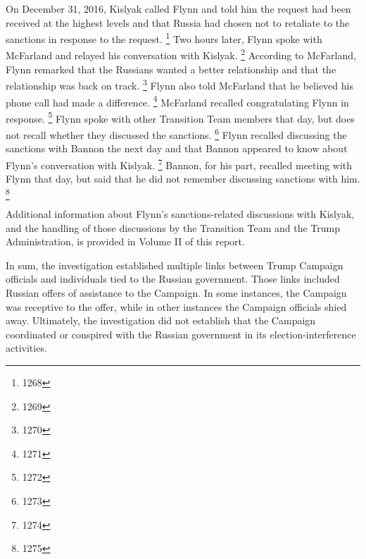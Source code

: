 On December 31, 2016, Kislyak called Flynn and told him the request had been received at the highest levels and that Russia had chosen not to retaliate to the sanctions in response to the request.%
\footnote{1268}
Two hours later, Flynn spoke with McFarland and relayed his conversation with Kislyak.%
\footnote{1269}
According to McFarland, Flynn remarked that the Russians wanted a better relationship and that the relationship was back on track.%
\footnote{1270}
Flynn also told McFarland that he believed his phone call had made a difference.%
\footnote{1271}
McFarland recalled congratulating Flynn in response.%
\footnote{1272}
Flynn spoke with other Transition Team members that day, but does not recall whether they discussed the sanctions.%
\footnote{1273}
Flynn recalled discussing the sanctions with Bannon the next day and that Bannon appeared to know about Flynn's conversation with Kislyak.%
\footnote{1274}
Bannon, for his part, recalled meeting with Flynn that day, but said that he did not remember discussing sanctions with him.%
\footnote{1275}

Additional information about Flynn's sanctions-related discussions with Kislyak, and the handling of those discussions by the Transition Team and the Trump Administration, is provided in Volume II of this report.

\hr

In sum, the investigation established multiple links between Trump Campaign officials and individuals tied to the Russian government.
Those links included Russian offers of assistance to the Campaign.
In some instances, the Campaign was receptive to the offer, while in other instances the Campaign officials shied away.
Ultimately, the investigation did not establish that the Campaign coordinated or conspired with the Russian government in its election-interference activities.
